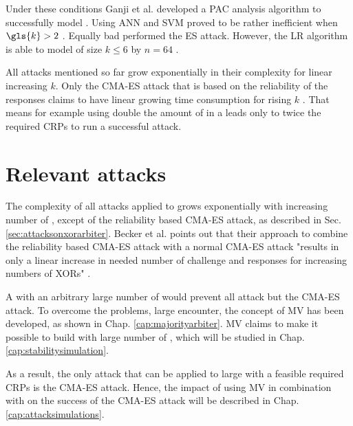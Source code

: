 Under these conditions Ganji et al. developed a \ac{PAC} analysis algorithm to successfully model \xpufs \cite{Ganji2015WhyPUFs}.
Using \ac{ANN} and \ac{SVM} proved to be rather inefficient when $\gls{k} > 2$ \cite{Hospodar2012MachineUsability}.
Equally bad performed the \ac{ES} attack.
However, the \ac{LR} algorithm is able to model \xpufs of size $k \le 6$ by $n = 64$ \cite{Ruhrmair2010ModelingFunctions}.

All attacks mentioned so far grow exponentially in their complexity for linear increasing $k$.
Only the \ac{CMA-ES} attack that is based on the reliability of the responses claims to have linear growing time consumption for rising $k$ \cite{Becker2015ThePUFs}.
That means for example using double the amount of \apufs in a \xpufs leads only to twice the required \acp{CRP} to run a successful attack.


\section{Relevant attacks}
\label{sec:essentialattacks}

The complexity of all attacks applied to \xpufs grows exponentially with increasing number of \apuf, except of the reliability based \ac{CMA-ES} attack, as described in Sec. \ref{sec:attacksonxorarbiter}.
Becker et al. points out that their approach to combine the reliability based \ac{CMA-ES} attack with a normal \ac{CMA-ES} attack "results in only a linear increase in needed number of challenge and responses for increasing numbers of XORs" \cite{Becker2015ThePUFs}.

A \xpuf with an arbitrary large number of \apufs would prevent all attack but the \ac{CMA-ES} attack.
To overcome the problems, large \xpufs encounter, the concept of \ac{MV} has been developed, as shown in Chap. \ref{cap:majorityarbiter}.
\ac{MV} claims to make it possible to build \xpufs with large number of \apufs, which will be studied in Chap. \ref{cap:stabilitysimulation}.

As a result, the only attack that can be applied to large \xpufs with a feasible required \acp{CRP} is the \ac{CMA-ES} attack.
Hence, the impact of using \ac{MV} in combination with \apufs on the success of the \ac{CMA-ES} attack will be described in Chap. \ref{cap:attacksimulations}.

